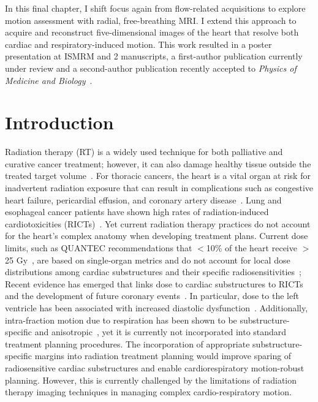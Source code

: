 In this final chapter, I shift focus again from flow-related acquisitions to explore motion assessment with radial, free-breathing MRI\@. I extend this approach to acquire and reconstruct five-dimensional images of the heart that resolve both cardiac and respiratory-induced motion. This work resulted in a poster presentation at ISMRM and 2 manuscripts, a first-author publication currently under review and a second-author publication recently accepted to \textit{Physics of Medicine and Biology}~\cite{ruffDeducingCardiorespiratoryMotion2026}. 

\section{Introduction}
Radiation therapy (RT) is a widely used technique for both palliative and curative cancer treatment; however, it can also damage healthy tissue outside the treated target volume~\cite{baskarCancerRadiationTherapy2012}. For thoracic cancers, the heart is a vital organ at risk for inadvertent radiation exposure that can result in complications such as congestive heart failure, pericardial effusion, and coronary artery disease~\cite{hullValvularDysfunctionCarotid2003,nabialek-trojanowskaCardiovascularComplicationsRadiotherapy2020,belzile-dugasRadiationInducedCardiovascularDisease2021}. Lung and esophageal cancer patients have shown high rates of radiation-induced cardiotoxicities (RICTs)~\cite{millerCharacterizingSensitiveCardiac2021}. Yet current radiation therapy practices do not account for the heart's complex anatomy when developing treatment plans. Current dose limits, such as QUANTEC recommendations that $<$10\% of the heart receive $>$ 25 Gy~\cite{bentzenQuantitativeAnalysesNormal2010,poitevin-chaconDosimetryLeftAnterior2018}, are based on single-organ metrics and do not account for local dose distributions among cardiac substructures and their specific radiosensitivities~\cite{millerCharacterizingSensitiveCardiac2021}; Recent evidence has emerged that links dose to cardiac substructures to RICTs and the development of future coronary events~\cite{millerCharacterizingSensitiveCardiac2021,morrisIncorporatingSensitiveCardiac2020,siaravasRadiationTreatmentMechanisms2023}. In particular, dose to the left ventricle has been associated with increased diastolic dysfunction~\cite{saikiExperimentalCardiacRadiation2017}. Additionally, intra-fraction motion due to respiration has been shown to be substructure-specific and anisotropic~\cite{millerCharacterizingSensitiveCardiac2021,el-sherifAssessmentIntrafractionBreathing2016}, yet it is currently not incorporated into standard treatment planning procedures. The incorporation of appropriate substructure-specific margins into radiation treatment planning would improve sparing of radiosensitive cardiac substructures and enable cardiorespiratory motion-robust planning. However, this is currently challenged by the limitations of radiation therapy imaging techniques in managing complex cardio-respiratory motion.

